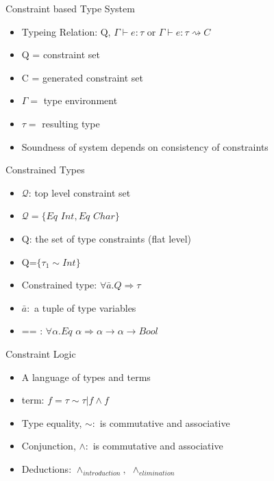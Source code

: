 \documentclass{beamer}
\begin{document}
\begin{frame}{Constraint based Type System}
\begin{itemize}
\item Typeing Relation: Q, $\Gamma \vdash e : \tau$ or $\Gamma \vdash e : \tau \rightsquigarrow C$
\item Q = constraint set
\item C = generated constraint set
\item $\Gamma=$ type environment
\item $\tau=$ resulting type
\item Soundness of system depends on consistency of constraints
\end{itemize}
\end{frame}

\begin{frame}{Constrained Types}
\begin{itemize}
\item $\mathcal{Q}$: top level constraint set
\item $\mathcal{Q}=\{Eq$ $Int, Eq$ $Char\}$
\end{itemize}
\begin{itemize}
\item Q: the set of type constraints (flat level)
\item Q=$\{\tau_1 \sim Int\}$
\end{itemize}
\begin{itemize}
\item Constrained type: $\forall \bar{a}. Q \Rightarrow \tau$
\item $\bar{a}:$ a tuple of type variables
\item == : $\forall \alpha. Eq$ $\alpha \Rightarrow \alpha \rightarrow \alpha \rightarrow Bool$
\end{itemize}
\end{frame}

\begin{frame}{Constraint Logic}
\begin{itemize}
\item A language of types and terms
\item term: $f=\tau \sim \tau | f \wedge f$
\item Type equality, $\sim:$ is commutative and associative
\item Conjunction, $\wedge:$ is commutative and associative
\item Deductions: $\wedge_{introduction},$ $\wedge_{elimination}$
\end{itemize}
\end{frame}
\end{document}
